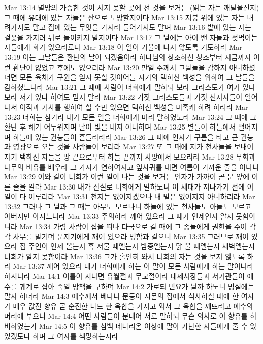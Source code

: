Mar 13:14  멸망의 가증한 것이 서지 못할 곳에 선 것을 보거든 (읽는 자는 깨달을진저)그 때에 유대에 있는 자들은 산으로 도망할지어다
Mar 13:15  지붕 위에 있는 자는 내려가지도 말고 집에 있는 무엇을 가지러 들어가지도 말며
Mar 13:16  밭에 있는 자는 겉옷을 가지러 뒤로 돌이키지 말지어다
Mar 13:17  그 날에는 아이 밴 자들과 젖먹이는 자들에게 화가 있으리로다
Mar 13:18  이 일이 겨울에 나지 않도록 기도하라
Mar 13:19  이는 그날들은 환난의 날이 되겠음이라 하나님의 창조하신 창조부터 지금까지 이런 환난이 없었고 후에도 없으리라
Mar 13:20  만일 주께서 그날들을 감하지 아니하셨더면 모든 육체가 구원을 얻지 못할 것이어늘 자기의 택하신 백성을 위하여 그 날들을 감하셨느니라
Mar 13:21  그 때에 사람이 너희에게 말하되 보라 그리스도가 여기 있다 보라 저기 있다 하여도 믿지 말라
Mar 13:22  거짓 그리스도들과 거짓 선지자들이 일어나서 이적과 기사를 행하여 할 수만 있으면 택하신 백성을 미혹케 하려 하리라
Mar 13:23  너희는 삼가라 내가 모든 일을 너희에게 미리 말하였노라
Mar 13:24  그 때에 그 환난 후 해가 어두워지며 달이 빛을 내지 아니하며
Mar 13:25  별들이 하늘에서 떨어지며 하늘에 있는 권능들이 흔들리리라
Mar 13:26  그 때에 인자가 구름을 타고 큰 권능과 영광으로 오는 것을 사람들이 보리라
Mar 13:27  또 그 때에 저가 천사들을 보내어 자기 택하신 자들을 땅 끝으로부터 하늘 끝까지 사방에서 모으리라
Mar 13:28  무화과나무의 비유를 배우라 그 가지가 연하여지고 잎사귀를 내면 여름이 가까운 줄을 아나니
Mar 13:29  이와 같이 너희가 이런 일이 나는 것을 보거든 인자가 가까이 곧 문 앞에 이른 줄을 알라
Mar 13:30  내가 진실로 너희에게 말하노니 이 세대가 지나가기 전에 이 일이 다 이루리라
Mar 13:31  천지는 없어지겠으나 내 말은 없어지지 아니하리라
Mar 13:32  그러나 그 날과 그 때는 아무도 모르나니 하늘에 있는 천사들도 아들도 모르고 아버지만 아시느니라
Mar 13:33  주의하라 깨어 있으라 그 때가 언제인지 알지 못함이니라
Mar 13:34  가령 사람이 집을 떠나 타국으로 갈 때에 그 종들에게 권한을 주어 각각 사무를 맡기며 문지기에게 깨어 있으라 명함과 같으니
Mar 13:35  그러므로 깨어 있으라 집 주인이 언제 올는지 혹 저물 때엘는지 밤중엘는지 닭 울 때엘는지 새벽엘는지 너희가 알지 못함이라
Mar 13:36  그가 홀연히 와서 너희의 자는 것을 보지 않도록 하라
Mar 13:37  깨어 있으라 내가 너희에게 하는 이 말이 모든 사람에게 하는 말이니라 하시니라
Mar 14:1  이틀이 지나면 유월절과 무교절이라 대제사장들과 서기관들이 예수를 궤계로 잡아 죽일 방책을 구하며
Mar 14:2  가로되 민요가 날까 하노니 명절에는 말자 하더라
Mar 14:3  예수께서 베다니 문둥이 시몬의 집에서 식사하실 때에 한 여자가 매우 값진 향유 곧 순전한 나드 한 옥합을 가지고 와서 그 옥합을 깨뜨리고 예수의 머리에 부으니
Mar 14:4  어떤 사람들이 분내어 서로 말하되 무슨 의사로 이 향유를 허비하였는가
Mar 14:5  이 향유를 삼백 데나리온 이상에 팔아 가난한 자들에게 줄 수 있었겠도다 하며 그 여자를 책망하는지라
